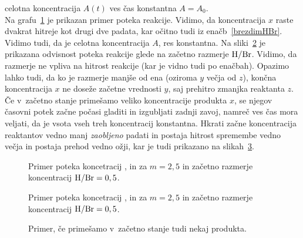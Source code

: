 \documentclass[a4paper,pdftex,12pt]{article}
\numberwithin{figure}{section} %
\begin{document}
celotna koncentracija $A(t)$ ves čas konstantna $A=A_0$.\\
Na grafu~\ref{slika8} je prikazan primer poteka reakcije. Vidimo, da koncentracija $x$ raste
dvakrat hitreje kot drugi dve padata, kar očitno tudi iz enačb~\ref{brezdimHBr}. Vidimo
tudi, da je celotna koncentracija $A$, res konstantna. Na sliki~\ref{slika9} je prikazana
odvisnost poteka reakcije glede na začetno razmerje $\ce{H}/\ce{Br}$. Vidimo, da razmerje
ne vpliva na hitrost reakcije (kar je vidno tudi po enačbah). Opazimo lahko tudi, da ko je
razmerje manjše od ena (oziroma $y$ večja od $z$), končna koncentracija $x$ ne doseže
začetne vrednosti $y$, saj prehitro zmanjka reaktanta $z$.\\
Če v~začetno stanje primešamo veliko koncentracije produkta $x$, se njegov časovni potek 
začne počasi gladiti in izgubljati zadnji zavoj, namreč ves čas mora veljati, da je
vsota vseh treh koncentracij konstantna. Hkrati začne koncentracija reaktantov vedno
manj \emph{zaobljeno} padati in postaja hitrost spremembe vedno večja in postaja prehod
vedno ožji, kar je tudi prikazano na slikah~\ref{slika10}.
\begin{figure}    
    \hspace{1cm}\resizebox{0.9\linewidth}{!}{}
    \caption{Primer poteka koncetracij ,  in  za $m=2,5$ in začetno 
    razmerje koncentracij $\ce{H}/\ce{Br}=0,5$.}
    \label{slika8}
\end{figure}
\begin{figure}    
    \hspace{1cm}\resizebox{0.9\linewidth}{!}{}
    \caption{Primer poteka koncetracij ,  in  za $m=2,5$ in začetno 
    razmerje koncentracij $\ce{H}/\ce{Br}=0,5$.}
    \label{slika9}
\end{figure}
\begin{figure}    
    \hspace{1cm}\resizebox{0.9\linewidth}{!}{}
    \caption{Primer, če primešamo v~začetno stanje tudi nekaj produkta.}
    \label{slika10}
\end{figure}


\end{document}
